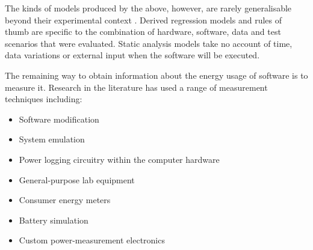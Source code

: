 The kinds of models produced by the above, however, are rarely generalisable beyond their experimental context \citep{Colmant2018}. Derived regression models and rules of thumb are specific to the combination of hardware, software, data and test scenarios that were evaluated. Static analysis models take no account of time, data variations or external input when the software will be executed.

The remaining way to obtain information about the energy usage of software is to measure it. Research in the literature has used a range of measurement techniques including:

\label{A66}
\begin{itemize}
    \item Software modification \citep{Seo2008} \citep{Do2009a} \citep{Sabovic2020}
    \item System emulation \citep{Sinha2001} \citep{Gurumurthi2002} \citep{Wilke2013}
    \item Power logging circuitry within the computer hardware \citep{Dutta2008} \citep{Kansal2008} \citep{Noureddine2012a}
    \item General-purpose lab equipment \citep{Flinn1999} \citep{Farkas2000} \citep{Ge2009} \citep{Ardito2018}
    \item Consumer energy meters \citep{Kaup2014} \citep{Kaup2018} \citep{Bekaroo2016}
    \item Battery simulation \citep{Zhou2013a} \citep{Naderiparizi2016}
    \item Custom power-measurement electronics \citep{Jiang2007} \citep{Stathopoulos2008} \citep{Andersen2009} \citep{Astudillo-Salinas2016}
\end{itemize}

